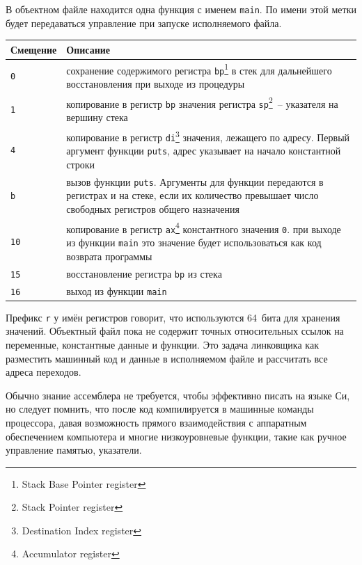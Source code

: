 \documentclass[myc.tex]{subfiles}
\begin{document}
В объектном файле находится одна функция с именем \texttt{main}. По имени этой метки будет передаваться управление при запуске исполняемого файла.


\noindent
\begin{small}
\begin{tabularx}{\textwidth}{|l|X|}
\hline
\textbf{Смещение} & \textbf{Описание}\\
\hline
\texttt{0} & сохранение содержимого регистра \texttt{bp}\footnote{Stack Base Pointer register} в стек для дальнейшего восстановления при выходе из процедуры\\
\hline
\texttt{1} & копирование в регистр \texttt{bp} значения регистра \texttt{sp}\footnote{Stack Pointer register}~-- указателя на вершину стека\\
\hline
\texttt{4} & копирование в регистр \texttt{di}\footnote{Destination Index register} значения, лежащего по адресу. Первый аргумент функции \texttt{puts}, адрес указывает на начало константной строки\\
\hline
\texttt{b} & вызов функции \texttt{puts}. Аргументы для функции передаются в регистрах и на стеке, если их количество превышает число свободных регистров общего назначения\\ 
\hline
\texttt{10} & копирование в регистр \texttt{ax}\footnote{Accumulator register} константного значения \texttt{0}. при выходе из функции \texttt{main} это значение будет использоваться как код возврата программы\\
\hline
\texttt{15} & восстановление регистра \texttt{bp} из стека\\
\hline
\texttt{16} & выход из функции \texttt{main}\\
\hline
\end{tabularx}
\end{small}

Префикс \texttt{r} у имён регистров говорит, что используются 64~бита для хранения значений. Объектный файл пока не содержит точных относительных ссылок на переменные, константные данные и функции. Это задача линковщика как разместить машинный код и данные в исполняемом файле и рассчитать все адреса переходов.

Обычно знание ассемблера не требуется, чтобы эффективно писать на языке Си, но следует помнить, что после код компилируется в машинные команды процессора, давая возможность прямого взаимодействия с аппаратным обеспечением компьютера и многие низкоуровневые функции, такие как ручное управление памятью, указатели.
\end{document}
